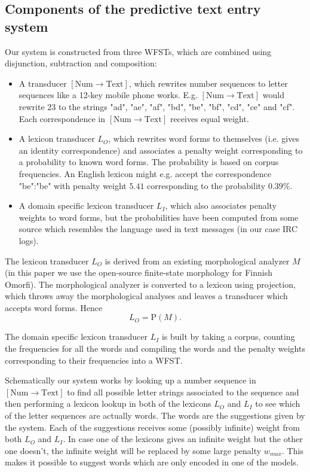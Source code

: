 \documentclass[a4paper,conference]{IEEEtran}
\begin{document}
\subsection{Components of the predictive text entry system}

Our system is constructed from three WFSTs, which are combined using
disjunction, subtraction and composition:

\begin{itemize}
\item A transducer $[\mathrm{Num}\rightarrow\mathrm{Text}]$, which
  rewrites number sequences to letter sequences like a 12-key mobile phone
  works. E.g. $[\mathrm{Num}\rightarrow\mathrm{Text}]$ would rewrite
  $23$ to the strings "ad", "ae", "af", "bd", "be", "bf", "cd", "ce"
  and "cf". Each correspondence in $[\mathrm{Num}\rightarrow\mathrm{Text}]$
  receives equal weight.
\item A lexicon transducer $L_O$, which rewrites word forms to
  themselves (i.e. gives an identity correspondence) and associates a
  penalty weight corresponding to a probability to known word
  forms. The probability is based on corpus frequencies. An English
  lexicon might e.g. accept the correspondence "be":"be" with penalty
  weight $5.41$ corresponding to the probability $0.39\%$.
\item A domain specific lexicon transducer $L_I$, which also
  associates penalty weights to word forms, but the probabilities have
  been computed from some source which resembles the language used in
  text messages (in our case IRC logs).
\end{itemize}

The lexicon transducer $L_O$ is derived from an existing morphological
analyzer $M$ (in this paper we use the open-source finite-state
morphology for Finnish Omorfi). The morphological analyzer is
converted to a lexicon using projection, which throws away the
morphological analyses and leaves a transducer which accepts
word forms. Hence
\begin{equation}L_O = \mathrm{P}(M)\text{.}\end{equation}

The domain specific lexicon transducer $L_I$ is built by taking a
corpus, counting the frequencies for all the words and compiling the
words and the penalty weights corresponding to their frequencies into
a WFST.

Schematically our system works by looking up a number sequence in
$[\mathrm{Num}\rightarrow\mathrm{Text}]$ to find all possible letter
strings associated to the sequence and then performing a lexicon
lookup in both of the lexicons $L_O$ and $L_I$ to see which of the
letter sequences are actually words. The words are the suggestions
given by the system. Each of the suggestions receives some (possibly
infinite) weight from both $L_O$ and $L_I$. In case one of the
lexicons gives an infinite weight but the other one doesn't, the
infinite weight will be replaced by some large penalty $w_{max}$. This
makes it possible to suggest words which are only encoded in one of
the models.
\end{document}
